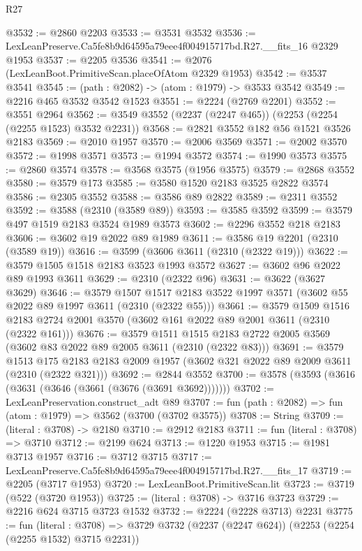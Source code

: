 \begin{lexlean}{R27}
\begin{coremodule}
@3532 := @2860 @2203
@3533 := @3531 @3532
@3536 := LexLeanPreserve.Ca5fe8b9d64595a79eee4f004915717bd.R27.__fits_16 @2329 @1953
@3537 := @2205 @3536
@3541 := @2076 (LexLeanBoot.PrimitiveScan.placeOfAtom @2329 @1953)
@3542 := @3537 @3541
@3545 := (path : @2082) -> (atom : @1979) -> @3533 @3542
@3549 := @2216 @465 @3532 @3542 @1523
@3551 := @2224 (@2769 @2201)
@3552 := @3551 @2964
@3562 := @3549 @3552 (@2237 (@2247 @465)) (@2253 (@2254 (@2255 @1523) @3532 @2231))
@3568 := @2821 @3552 @182 @56 @1521 @3526 @2183
@3569 := @2010 @1957
@3570 := @2006 @3569
@3571 := @2002 @3570
@3572 := @1998 @3571
@3573 := @1994 @3572
@3574 := @1990 @3573
@3575 := @2860 @3574
@3578 := @3568 @3575 (@1956 @3575)
@3579 := @2868 @3552
@3580 := @3579 @173
@3585 := @3580 @1520 @2183 @3525 @2822 @3574
@3586 := @2305 @3552
@3588 := @3586 @89 @2822
@3589 := @2311 @3552
@3592 := @3588 (@2310 (@3589 @89))
@3593 := @3585 @3592
@3599 := @3579 @497 @1519 @2183 @3524 @1989 @3573
@3602 := @2296 @3552 @218 @2183
@3606 := @3602 @19 @2022 @89 @1989
@3611 := @3586 @19 @2201 (@2310 (@3589 @19))
@3616 := @3599 (@3606 @3611 (@2310 (@2322 @19)))
@3622 := @3579 @1505 @1518 @2183 @3523 @1993 @3572
@3627 := @3602 @96 @2022 @89 @1993 @3611
@3629 := @2310 (@2322 @96)
@3631 := @3622 (@3627 @3629)
@3646 := @3579
    @1507
    @1517
    @2183
    @3522
    @1997
    @3571
    (@3602 @55 @2022 @89 @1997 @3611 (@2310 (@2322 @55)))
@3661 := @3579
    @1509
    @1516
    @2183
    @2724
    @2001
    @3570
    (@3602 @161 @2022 @89 @2001 @3611 (@2310 (@2322 @161)))
@3676 := @3579
    @1511
    @1515
    @2183
    @2722
    @2005
    @3569
    (@3602 @83 @2022 @89 @2005 @3611 (@2310 (@2322 @83)))
@3691 := @3579
    @1513
    @175
    @2183
    @2183
    @2009
    @1957
    (@3602 @321 @2022 @89 @2009 @3611 (@2310 (@2322 @321)))
@3692 := @2844 @3552
@3700 := @3578 (@3593 (@3616 (@3631 (@3646 (@3661 (@3676 (@3691 @3692)))))))
@3702 := LexLeanPreservation.construct_adt @89
@3707 := fun (path : @2082) => fun (atom : @1979) => @3562 (@3700 (@3702 @3575))
@3708 := String
@3709 := (literal : @3708) -> @2180
@3710 := @2912 @2183
@3711 := fun (literal : @3708) => @3710
@3712 := @2199 @624
@3713 := @1220 @1953
@3715 := @1981 @3713 @1957
@3716 := @3712 @3715
@3717 := LexLeanPreserve.Ca5fe8b9d64595a79eee4f004915717bd.R27.__fits_17
@3719 := @2205 (@3717 @1953)
@3720 := LexLeanBoot.PrimitiveScan.lit
@3723 := @3719 (@522 (@3720 @1953))
@3725 := (literal : @3708) -> @3716 @3723
@3729 := @2216 @624 @3715 @3723 @1532
@3732 := @2224 (@2228 @3713) @2231
@3775 := fun (literal : @3708) =>
  @3729
    @3732
    (@2237 (@2247 @624))
    (@2253 (@2254 (@2255 @1532) @3715 @2231))

\end{coremodule}
\end{lexlean}
